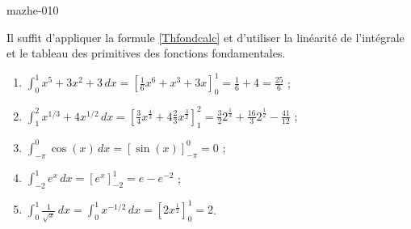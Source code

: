 
\begin{corrige}{mazhe-010}

    Il suffit d'appliquer la formule \eqref{Thfondcalc} et d'utiliser la linéarité de l'intégrale et le tableau des primitives des fonctions fondamentales. 
  \begin{enumerate}
  \item $\displaystyle \int_0^1 x^5+3x^2+3 \, dx = \left[\frac{1}{6} x^6 + x^3 +3x \right]_0^1 = \frac{1}{6}+4 = \frac{25}{6} $ ;
  \item $\displaystyle \int_1^2 x^{1/3}+4x^{1/2} \, dx  = \left[\frac{3}{4} x^{\frac{4}{3}} + 4 \frac{2}{3} x^{\frac{3}{2}} \right]_1^2 =\frac{3}{2} 2^{\frac{1}{3}} + \frac{16}{3} 2^{\frac{1}{2}} - \frac{41}{12} $ ;
  \item $\displaystyle \int_{-\pi}^{0} \cos(x) \, dx  = \left[\sin(x) \right]_{-\pi}^0  = 0$ ;
  \item $\displaystyle \int_{-2}^{1} e^x \, dx = \left[e^x \right]_{-2}^{1} = e - e^{-2} $ ;
  \item $\displaystyle \int_{0}^{1} \frac{1}{\sqrt{x}} \, dx =\int_{0}^{1} x^{-1/2} \, dx  = \left[2x^{\frac{1}{2}}  \right]_0^1  = 2$.
  \end{enumerate}
\end{corrige}
